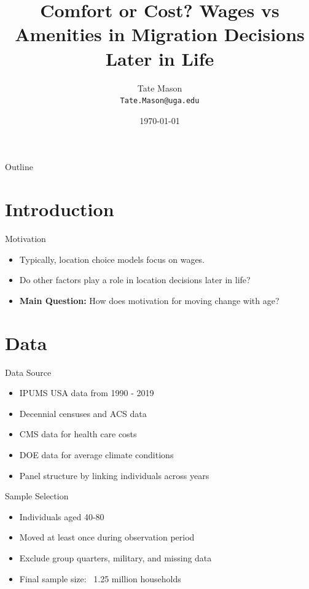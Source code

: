 \documentclass{beamer}
\title{Comfort or Cost? Wages vs Amenities in Migration Decisions Later in Life}
\author[Tate Mason]{Tate Mason \\ \smallskip \texttt{Tate.Mason@uga.edu}}
\institute[Univ. of Georgia]{John Munro Godfrey Sr. Department of Economics \\ The University of Georgia}
\date{\today} %
\begin{document}
\begin{frame}
  \titlepage
\end{frame}

\begin{frame}{Outline}
  \tableofcontents
\end{frame}

\section{Introduction}
\begin{frame}{Motivation}
  \begin{itemize}
    \item Typically, location choice models focus on wages.
    \item Do other factors play a role in location decisions later in life?
    \item \textbf{Main Question:} How does motivation for moving change with age?
  \end{itemize}
\end{frame}

\section{Data}
\begin{frame}{Data Source}
  \begin{itemize}
    \item IPUMS USA data from 1990 - 2019
    \item Decennial censuses and ACS data
    \item CMS data for health care costs
    \item DOE data for average climate conditions
    \item Panel structure by linking individuals across years
  \end{itemize}
\end{frame}

\begin{frame}{Sample Selection}
  \begin{itemize}
    \item Individuals aged 40-80
    \item Moved at least once during observation period
    \item Exclude group quarters, military, and missing data
    \item Final sample size: ~1.25 million households
  \end{itemize}
\end{frame}
\end{document}
